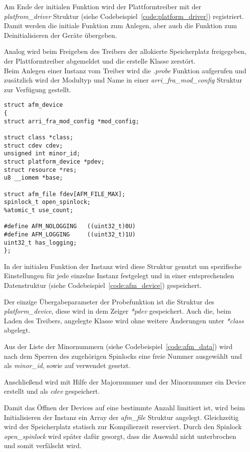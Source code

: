 Am Ende der initialen Funktion wird der Plattformtreiber mit der \textit{platfrom\_driver} Struktur (siehe Codebeispiel~\ref{code:platform_driver}) registriert. Damit werden die initiale Funktion zum Anlegen, aber auch die Funktion zum Deinitialisieren der Geräte übergeben.


Analog wird beim Freigeben des Treibers der allokierte Speicherplatz freigegeben, der Plattformtreiber abgemeldet und die erstelle Klasse zerstört.\\


Beim Anlegen einer Instanz vom Treiber wird die \textit{.probe} Funktion aufgerufen und zusätzlich wird der Modultyp und Name in einer \textit{arri\_fra\_mod\_config} Struktur zur Verfügung gestellt.
\begin{lstlisting}
struct afm_device 
{
struct arri_fra_mod_config *mod_config;

struct class *class;
struct cdev cdev;
unsigned int minor_id;
struct platform_device *pdev;
struct resource *res;
u8 __iomem *base;

struct afm_file fdev[AFM_FILE_MAX];
spinlock_t open_spinlock;
%atomic_t use_count;

#define AFM_NOLOGGING   ((uint32_t)0U)
#define AFM_LOGGING     ((uint32_t)1U)
uint32_t has_logging;
};
\end{lstlisting}

In der initialen Funktion der Instanz wird diese Struktur genutzt um spezifische Einstellungen für jede einzelne Instanz festgelegt und in einer entsprechenden Datenstruktur (siehe Codebeispiel~\ref{code:afm_device}) gespeichert. 


Der einzige Übergabeparameter der Probefunktion ist die Struktur des \textit{platform\_device}, diese wird in dem Zeiger \textit{*pdev} gespeichert. Auch die, beim Laden des Treibers, angelegte Klasse wird ohne weitere Änderungen unter \textit{*class} abgelegt. 

Aus der Liste der Minornummern (siehe Codebeispiel~\ref{code:afm_data}) wird nach dem Sperren des zugehörigen Spinlocks eine freie Nummer ausgewählt und als \textit{minor\_id}, sowie auf verwendet gesetzt. 

Anschließend wird mit Hilfe der Majornummer und der Minornummer ein Device erstellt und als \textit{cdev} gespeichert. 

Damit das Öffnen der Devices auf eine bestimmte Anzahl limitiert ist, wird beim Initialisieren der Instanz ein Array der \textit{afm\_file} Struktur angelegt. Gleichzeitig wird der Speicherplatz statisch zur Kompilierzeit reserviert. Durch den Spinlock \textit{open\_spinlock} wird später dafür gesorgt, dass die Auswahl nicht unterbrochen und somit verfälscht wird.

